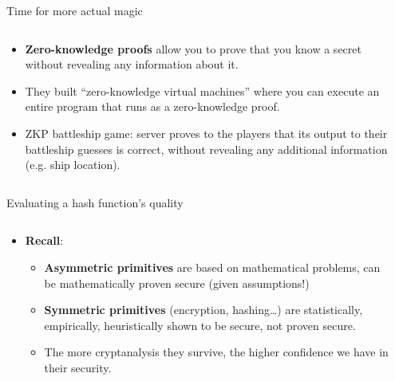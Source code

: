 \documentclass[aspectratio=169, lualatex, handout]{beamer}
\begin{document}
\begin{frame}{Time for more actual magic}
	\begin{columns}[c]
		\begin{column}{0.6\textwidth}
			\begin{itemize}[<+->]
				\item \textbf{Zero-knowledge proofs} allow you to prove that you know
				      a secret without revealing any information about it.
				\item They built ``zero-knowledge virtual machines'' where you can execute
				      an entire program that runs as a zero-knowledge proof.
				\item ZKP battleship game: server proves to the players that its
				      output to their battleship guesses is correct, without revealing any
				      additional information (e.g. ship location).
			\end{itemize}
		\end{column}
		\begin{column}{0.4\textwidth}
		\end{column}
	\end{columns}
\end{frame}

\begin{frame}{Evaluating a hash function's quality}
	\begin{columns}[c]
		\begin{column}{0.6\textwidth}
			\begin{itemize}[<+->]
				\item \textbf{Recall}:
				      \begin{itemize}[<+->]
					      \item \textbf{Asymmetric primitives} are based on mathematical
					            problems, can be mathematically proven secure (given assumptions!)
					      \item \textbf{Symmetric primitives} (encryption, hashing\ldots)
					            are statistically, empirically, heuristically shown to be secure,
					            not proven secure.
					      \item The more cryptanalysis they survive, the higher confidence
					            we have in their security.
				      \end{itemize}
			\end{itemize}
		\end{column}

		\begin{column}{0.4\textwidth}
		\end{column}
	\end{columns}
\end{frame}
\end{document}
